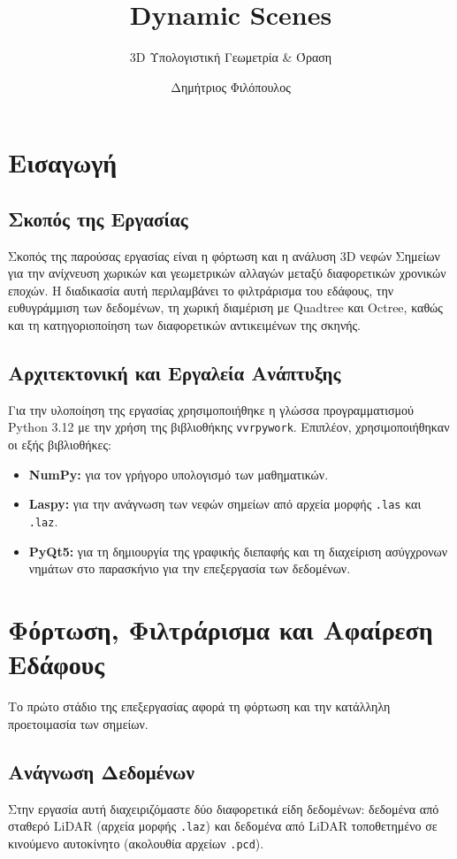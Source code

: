 \documentclass[acmsmall,screen,nonacm]{acmart}
\title{Dynamic Scenes}
\subtitle{3D Υπολογιστική Γεωμετρία \& Όραση }
\author{Δημήτριος Φιλόπουλος}
\affiliation{
	\institution{Τμήμα ΗΜ\&ΤΥ, Πανεπιστήμιο Πατρών}
	\country{Ελλάδα}
}
\begin{document}
	
	\maketitle
	
	\section{Εισαγωγή}
	
	\subsection{Σκοπός της Εργασίας}
	Σκοπός της παρούσας εργασίας είναι η φόρτωση και η ανάλυση 3D νεφών Σημείων για την ανίχνευση χωρικών και γεωμετρικών αλλαγών μεταξύ διαφορετικών χρονικών εποχών. Η διαδικασία αυτή περιλαμβάνει το φιλτράρισμα του εδάφους, την ευθυγράμμιση των δεδομένων, τη χωρική διαμέριση με Quadtree και Octree, καθώς και τη κατηγοριοποίηση των διαφορετικών αντικειμένων της σκηνής.
	
	\subsection{Αρχιτεκτονική και Εργαλεία Ανάπτυξης}
	Για την υλοποίηση της εργασίας χρησιμοποιήθηκε η γλώσσα προγραμματισμού Python 3.12 με την χρήση της βιβλιοθήκης \texttt{vvrpywork}. Επιπλέον, χρησιμοποιήθηκαν οι εξής βιβλιοθήκες:
	\begin{itemize}
		\item \textbf{NumPy:} για τον γρήγορο υπολογισμό των μαθηματικών.
		\item \textbf{Laspy:} για την ανάγνωση των νεφών σημείων από αρχεία μορφής \texttt{.las} και \texttt{.laz}.
		\item \textbf{PyQt5:} για τη δημιουργία της γραφικής διεπαφής και τη διαχείριση ασύγχρονων νημάτων στο παρασκήνιο για την επεξεργασία των δεδομένων.
	\end{itemize}


	\section{Φόρτωση, Φιλτράρισμα και Αφαίρεση Εδάφους}
	Το πρώτο στάδιο της επεξεργασίας αφορά τη φόρτωση και την κατάλληλη προετοιμασία των σημείων.
	
	\subsection{Ανάγνωση Δεδομένων}
	Στην εργασία αυτή διαχειριζόμαστε δύο διαφορετικά είδη δεδομένων: δεδομένα από σταθερό LiDAR (αρχεία μορφής \texttt{.laz}) και δεδομένα από LiDAR τοποθετημένο σε κινούμενο αυτοκίνητο (ακολουθία αρχείων \texttt{.pcd}).
	
\end{document}
